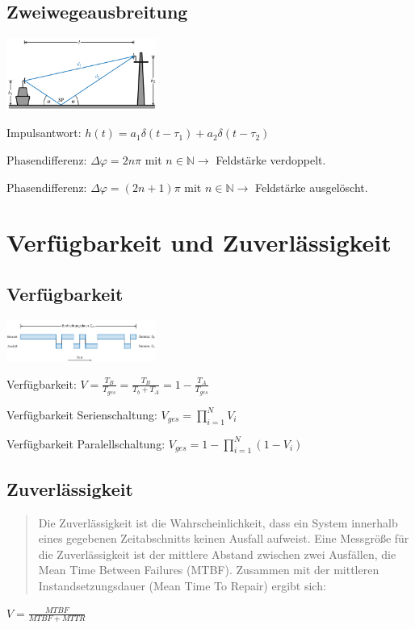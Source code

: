 \documentclass[german]{latex4ei/latex4ei_sheet}
\begin{document}
\begin{sectionbox}{\subsection{Zweiwegeausbreitung}}
        \item \includegraphics[width=185px]{img/Zweiwegeausbreitung.png}
        \item Impulsantwort: $h(t) = a_1 \delta(t-\tau_1)+ a_2 \delta(t-\tau_2)$
        \item Phasendifferenz: $\Delta \varphi = 2 n \pi$ mit $n \in \mathbb{N} \rightarrow$ Feldstärke verdoppelt.
        \item Phasendifferenz: $\Delta \varphi = (2n+1) \pi$ mit $n \in \mathbb{N} \rightarrow$ Feldstärke ausgelöscht.
\end{sectionbox}
\section{Verfügbarkeit und Zuverlässigkeit}
    \begin{sectionbox}{\subsection{Verfügbarkeit}}
        \item \includegraphics[width=185px]{img/Verfuegbarkeit.png}
        \item Verfügbarkeit: $V= \frac{T_B}{T_{ges}} = \frac{T_B}{T_b+T_A} = 1-\frac{T_A}{T_{ges}}$
        \item Verfügbarkeit Serienschaltung: $V_{ges} = \prod\limits_{i=1}^N V_i $
        \item Verfügbarkeit Paralellschaltung: $V_{ges} = 1-\prod\limits_{i=1}^N (1-V_i) $
    \end{sectionbox}
    \begin{sectionbox}{\subsection{Zuverlässigkeit}}
        \item \begin{quote}
            Die Zuverlässigkeit ist die Wahrscheinlichkeit, dass ein System innerhalb eines
            gegebenen Zeitabschnitts keinen Ausfall aufweist. Eine Messgröße für die 
            Zuverlässigkeit ist der mittlere Abstand zwischen zwei Ausfällen, die Mean Time Between Failures (MTBF).
            Zusammen mit der mittleren Instandsetzungsdauer (Mean Time To Repair) ergibt sich:
        \end{quote}
        $V = \frac{MTBF}{MTBF+MTTR}$
    \end{sectionbox}
\end{document}
